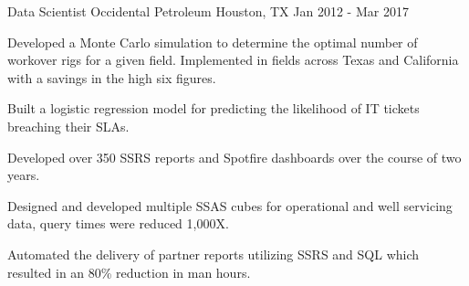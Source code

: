 \begin{cventries}
\cventry
{Data Scientist} %
{Occidental Petroleum} %
{Houston, TX} %
{Jan 2012 - Mar 2017} %
{ %
\begin{cvitems}
\item {Developed a Monte Carlo simulation to determine the optimal number of workover rigs for a given field. Implemented in fields across Texas and California with a savings in the high six figures.}
\item {Built a logistic regression model for predicting the likelihood of IT tickets breaching their SLAs.}
\end{cvitems}
}

{
\begin{cvitems}
\item {Developed over 350 SSRS reports and Spotfire dashboards over the course of two years.}
\item {Designed and developed multiple SSAS cubes for operational and well servicing data, query times were reduced 1,000X.}
\item {Automated the delivery of partner reports utilizing SSRS and SQL which resulted in an 80\% reduction in man hours.}
\end{cvitems}
}

\end{cventries}